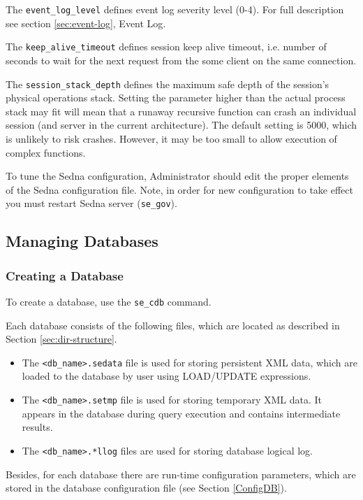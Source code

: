 \documentclass[a4paper,12pt]{article}
\begin{document}
The \verb!event_log_level! defines event log severity level (0-4). For full
description see section \ref{sec:event-log}, Event Log.

The \verb!keep_alive_timeout! defines session keep alive timeout, i.e. number
of seconds to wait for the next request from the some client on the same
connection.

The \verb!session_stack_depth! defines the maximum safe depth of the session's 
physical operations stack. Setting the parameter higher than the actual process
stack may fit will mean that a runaway recursive function can crash an individual
session (and server in the current architecture). The default setting is 5000, 
which is unlikely to risk crashes. However, it may be too small to allow
execution of complex functions. 

To tune the Sedna configuration, Administrator should edit the proper elements
of the Sedna configuration file. Note, in order for new configuration to take
effect you must restart Sedna server (\verb!se_gov!).

\subsection{Managing Databases}
\subsubsection{Creating a Database}
\label{CreateDB}
To create a database, use the \verb!se_cdb! command.

Each database consists of the following files, which are located as described in Section \ref{sec:dir-structure}.

\begin{itemize}
\item The \verb!<db_name>.sedata! file is used for storing persistent XML data, which are loaded to the database by user using LOAD/UPDATE expressions.
\item The \verb!<db_name>.setmp! file is used for storing temporary XML data. It appears in the database during query execution and contains intermediate results.
\item The \verb!<db_name>.*llog! files are used for storing database logical log.
\end{itemize}

Besides, for each database there are run-time configuration parameters, which are stored in the database configuration file (see Section \ref{ConfigDB}).
\end{document}
